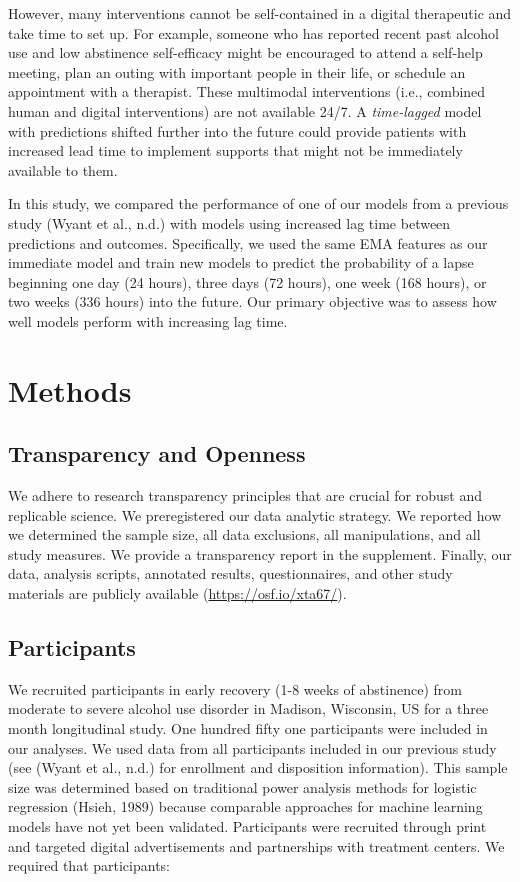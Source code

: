 \documentclass[
]{agujournal2019}
\begin{document}
However, many interventions cannot be self-contained in a digital
therapeutic and take time to set up. For example, someone who has
reported recent past alcohol use and low abstinence self-efficacy might
be encouraged to attend a self-help meeting, plan an outing with
important people in their life, or schedule an appointment with a
therapist. These multimodal interventions (i.e., combined human and
digital interventions) are not available 24/7. A \emph{time-lagged}
model with predictions shifted further into the future could provide
patients with increased lead time to implement supports that might not
be immediately available to them.

In this study, we compared the performance of one of our models from a
previous study (Wyant et al., n.d.) with models using increased lag time
between predictions and outcomes. Specifically, we used the same EMA
features as our immediate model and train new models to predict the
probability of a lapse beginning one day (24 hours), three days (72
hours), one week (168 hours), or two weeks (336 hours) into the future.
Our primary objective was to assess how well models perform with
increasing lag time.

\section{Methods}\label{methods}

\subsection{Transparency and Openness}\label{transparency-and-openness}

We adhere to research transparency principles that are crucial for
robust and replicable science. We preregistered our data analytic
strategy. We reported how we determined the sample size, all data
exclusions, all manipulations, and all study measures. We provide a
transparency report in the supplement. Finally, our data, analysis
scripts, annotated results, questionnaires, and other study materials
are publicly available (\url{https://osf.io/xta67/}).

\subsection{Participants}\label{participants}

We recruited participants in early recovery (1-8 weeks of abstinence)
from moderate to severe alcohol use disorder in Madison, Wisconsin, US
for a three month longitudinal study. One hundred fifty one participants
were included in our analyses. We used data from all participants
included in our previous study (see (Wyant et al., n.d.) for enrollment
and disposition information). This sample size was determined based on
traditional power analysis methods for logistic regression (Hsieh, 1989)
because comparable approaches for machine learning models have not yet
been validated. Participants were recruited through print and targeted
digital advertisements and partnerships with treatment centers. We
required that participants:
\end{document}
